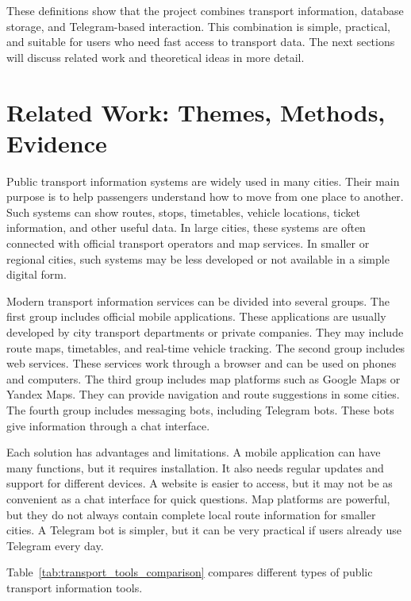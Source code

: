 These definitions show that the project combines transport information, database storage, and Telegram-based interaction. This combination is simple, practical, and suitable for users who need fast access to transport data. The next sections will discuss related work and theoretical ideas in more detail.

\section{Related Work: Themes, Methods, Evidence}
\label{sec:related}

Public transport information systems are widely used in many cities. Their main purpose is to help passengers understand how to move from one place to another. Such systems can show routes, stops, timetables, vehicle locations, ticket information, and other useful data. In large cities, these systems are often connected with official transport operators and map services. In smaller or regional cities, such systems may be less developed or not available in a simple digital form. \cite{kasinathan2020transport}

Modern transport information services can be divided into several groups. The first group includes official mobile applications. These applications are usually developed by city transport departments or private companies. They may include route maps, timetables, and real-time vehicle tracking. The second group includes web services. These services work through a browser and can be used on phones and computers. The third group includes map platforms such as Google Maps or Yandex Maps. They can provide navigation and route suggestions in some cities. The fourth group includes messaging bots, including Telegram bots. These bots give information through a chat interface.\cite{adamopoulou2020chatbots, dale2016return}

Each solution has advantages and limitations. A mobile application can have many functions, but it requires installation. It also needs regular updates and support for different devices. A website is easier to access, but it may not be as convenient as a chat interface for quick questions. Map platforms are powerful, but they do not always contain complete local route information for smaller cities. A Telegram bot is simpler, but it can be very practical if users already use Telegram every day. \cite{following2019messaging}

Table~\ref{tab:transport_tools_comparison} compares different types of public transport information tools.

